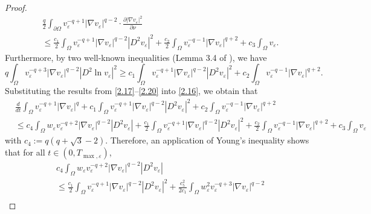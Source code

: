 \documentclass[12pt]{article}
\theoremstyle{plain}
\theoremstyle{definition}
\numberwithin{equation}{section}
\begin{document}
\begin{proof}
\begin{equation}
        \begin{split}
            &\frac{q}{2}\int_{\partial\Omega}v_\varepsilon^{-q+1}|\nabla v_\varepsilon|^{q-2}\cdot\frac{\partial|\nabla v_\varepsilon|^2}{\partial\nu}\\
            &\leq\frac{c_1}{2}\int_\Omega v_\varepsilon^{-q+1}|\nabla v_\varepsilon|^{q-2}|D^2 v_\varepsilon|^2+\frac{c_2}{2}\int_\Omega v_\varepsilon^{-q-1}|\nabla v_\varepsilon|^{q+2}+c_3\int_\Omega v_\varepsilon.
        \end{split}
    \end{equation}
    Furthermore, by two well-known inequalities (Lemma 3.4 of \cite{WDCDSB}), we have
    \begin{equation}\label{2.20}
        q\int_\Omega v_\varepsilon^{-q+3}|\nabla v_\varepsilon|^{q-2}|D^2\ln v_\varepsilon|^2\geq c_1\int_\Omega v_\varepsilon^{-q+1}|\nabla v_\varepsilon|^{q-2}|D^2 v_\varepsilon|^2+c_2\int_\Omega v_\varepsilon^{-q-1}|\nabla v_\varepsilon|^{q+2}.
    \end{equation}
    Substituting the results from \eqref{2.17}--\eqref{2.20} into \eqref{2.16}, we obtain that
    \begin{align}\label{2.21}
         &\frac{d}{dt}\int_\Omega v_\varepsilon^{-q+1}|\nabla v_\varepsilon|^q+c_1\int_\Omega v_\varepsilon^{-q+1}|\nabla v_\varepsilon|^{q-2}|D^2 v_\varepsilon|^2+c_2\int_\Omega v_\varepsilon^{-q-1}|\nabla v_\varepsilon|^{q+2}\\
         &\leq c_4\int_\Omega w_\varepsilon v_\varepsilon^{-q+2}|\nabla v_\varepsilon|^{q-2}|D^2 v_\varepsilon|+\frac{c_1}{2}\int_\Omega v_\varepsilon^{-q+1}|\nabla v_\varepsilon|^{q-2}|D^2 v_\varepsilon|^2+\frac{c_2}{2}\int_\Omega v_\varepsilon^{-q-1}|\nabla v_\varepsilon|^{q+2}+c_3\int_\Omega v_\varepsilon\nonumber
    \end{align}
    with $c_4:=q(q+\sqrt{3}-2)$. Therefore, an application of Young's inequality shows that for all $t\in(0,T_{\max,\varepsilon})$,
    \begin{equation*}
        \begin{split}
            &c_4\int_\Omega w_\varepsilon v_\varepsilon^{-q+2}|\nabla v_\varepsilon|^{q-2}|D^2v_\varepsilon|\\
            &\leq\frac{c_1}{2}\int_\Omega v_\varepsilon^{-q+1}|\nabla v_\varepsilon|^{q-2}|D^2v_\varepsilon|^2+\frac{c_5^2}{2c_1}\int_\Omega w_\varepsilon^2v_\varepsilon^{-q+3}|\nabla v_\varepsilon|^{q-2}\\

\end{split}
\end{equation*}
\end{proof}
\end{document}
